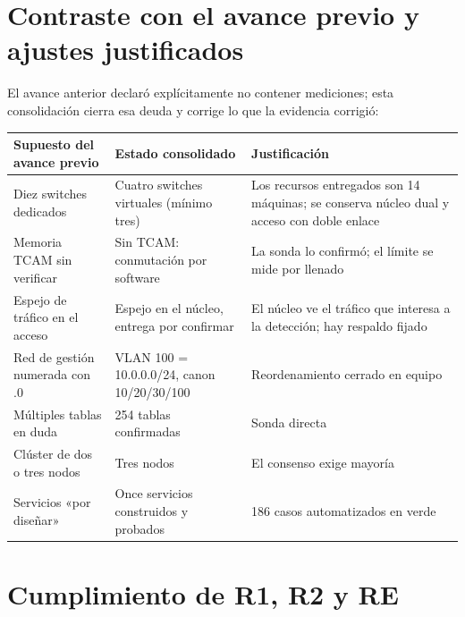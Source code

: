 \documentclass[11pt,a4paper]{article}
\begin{document}
\section{Contraste con el avance previo y ajustes justificados}

El avance anterior declaró explícitamente no contener mediciones; esta consolidación cierra esa deuda y corrige lo que la evidencia corrigió:

\begin{longtable}{p{5.0cm}p{4.6cm}p{4.4cm}}
\toprule
\textbf{Supuesto del avance previo} & \textbf{Estado consolidado} & \textbf{Justificación}\\
\midrule
Diez switches dedicados & Cuatro switches virtuales (mínimo tres) & Los recursos entregados son 14 máquinas; se conserva núcleo dual y acceso con doble enlace\\
Memoria TCAM sin verificar & Sin TCAM: conmutación por software & La sonda lo confirmó; el límite se mide por llenado\\
Espejo de tráfico en el acceso & Espejo en el núcleo, entrega por confirmar & El núcleo ve el tráfico que interesa a la detección; hay respaldo fijado\\
Red de gestión numerada con .0 & VLAN 100 = 10.0.0.0/24, canon 10/20/30/100 & Reordenamiento cerrado en equipo\\
Múltiples tablas en duda & 254 tablas confirmadas & Sonda directa\\
Clúster de dos o tres nodos & Tres nodos & El consenso exige mayoría\\
Servicios «por diseñar» & Once servicios construidos y probados & 186 casos automatizados en verde\\
\bottomrule
\end{longtable}

\section{Cumplimiento de R1, R2 y RE}
\end{document}
